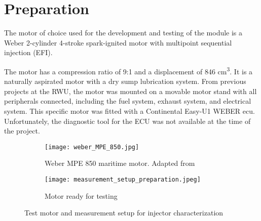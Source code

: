 
\chapter{Preparation}

    The motor of choice used for the development and testing of the module is a Weber 2-cylinder 4-stroke spark-ignited motor with multipoint sequential injection (EFI).

    The motor has a compression ratio of 9:1 and a displacement of 846 cm\textsuperscript{3}. It is a naturally aspirated motor with a dry sump lubrication system. From previous projects at the RWU, the motor was mounted on a movable motor stand with all peripherals connected, including the fuel system, exhaust system, and electrical system. This specific motor was fitted with a Continental Easy-U1 WEBER \gls{ecu}. Unfortunately, the diagnostic tool for the ECU was not available at the time of the project.

    \begin{figure}[H]
        \centering
        \begin{subfigure}{0.48\textwidth}
            \centering
            \texttt{[image: weber\_MPE\_850.jpg]}
            \caption{Weber MPE 850 maritime motor. Adapted from \autocite{shawWeberMPE8502014}}
            \label{fig:weber_motor}
        \end{subfigure}
        \hfill
        \begin{subfigure}{0.48\textwidth}
            \centering
            \texttt{[image: measurement\_setup\_preparation.jpeg]}
            \caption{Motor ready for testing}
            \label{fig:measurement_setup}
        \end{subfigure}
        \caption{Test motor and measurement setup for injector characterization}
        \label{fig:motor_and_setup}
    \end{figure}

